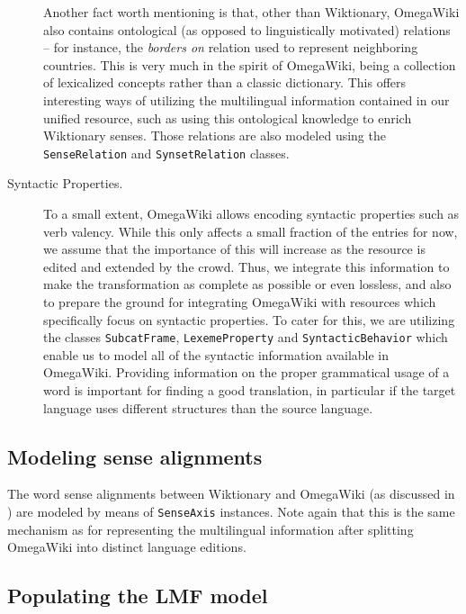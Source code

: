 \documentclass[output=paper]{LSP/langsci}
\begin{document}
\begin{description}
Another fact worth mentioning is that, other than Wiktionary, OmegaWiki also contains ontological (as opposed to linguistically motivated) relations -- for instance, the \textit{borders on} relation used to represent neighboring countries. This is very much in the spirit of OmegaWiki, being a collection of lexicalized concepts rather than a classic dictionary. This offers interesting ways of utilizing the multilingual information contained in our unified resource, such as using this ontological knowledge to enrich Wiktionary senses. Those relations are also modeled using the \texttt{SenseRelation} and \texttt{SynsetRelation} classes.


\item[Syntactic Properties.]
To a small extent, OmegaWiki allows encoding syntactic properties such as verb valency. While this only affects a small fraction of the entries for now, we assume that the importance of this will increase as the resource is edited and extended by the crowd. Thus, we integrate this information to make the transformation as complete as possible or even lossless, and also to prepare the ground for integrating OmegaWiki with resources which specifically focus on syntactic properties. To cater for this, we are utilizing the classes \texttt{SubcatFrame}, \texttt{LexemeProperty} and \texttt{SyntacticBehavior} which enable us to model all of the syntactic information available in OmegaWiki. Providing information on the proper grammatical usage of a word is important for finding a good translation, in particular if the target language uses different structures than the source language.
\end{description}


\subsection{Modeling sense alignments}
\label{sec:matuschek:lmf:alignment}

The word sense alignments between Wiktionary and OmegaWiki (as discussed in ) are modeled by means of \texttt{SenseAxis} instances. Note again that this is the same mechanism as for representing the multilingual information after splitting OmegaWiki into distinct language editions.

\subsection{Populating the LMF model}
\end{document}
